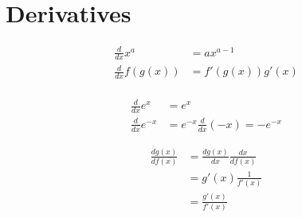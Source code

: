 \chapter{Derivatives}

\begin{align}
  \frac{d}{dx} x^{a} &= a x^{a - 1} \\
  \frac{d}{dx} f\left( g \left( x \right) \right) &=
    f'\left( g\left( x \right) \right) g'\left( x \right) \\
\end{align}

\begin{align}
  \frac{d}{dx} e^{x} &= e^{x} \\
  \frac{d}{dx} e^{-x} &= e^{-x} \frac{d}{dx} \left( -x \right) = - e^{-x}
\end{align}

\begin{align*}
  \frac{d g\left( x \right)}{d f\left( x \right)}
    &= \frac{d g\left( x \right)}{dx} \frac{dx}{d f\left( x \right)} \\
    &= g'\left( x \right) \frac{1}{f'\left( x \right)} \\
    &= \frac{g'\left( x \right)}{f'\left( x \right)}
\end{align*}
